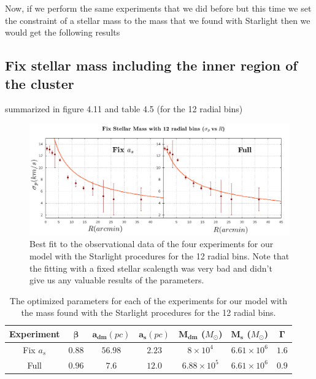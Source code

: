 Now, if we perform the same experiments that we did before but this time we set the constraint of a stellar mass to the mass that we found with Starlight then we would get the following results

\subsection{Fix stellar mass including the inner region of the cluster}

 summarized in figure 4.11 and table 4.5 (for the 12 radial bins)

\begin{figure}[H]
\centering
\includegraphics[width=15cm]{images/Starlight_2.png}
\caption[Best fit of our model with the mass found with the Starlight procedures for the 12 radial bins]{Best fit to the observational data of the four experiments for our model with the Starlight procedures for the 12 radial bins. Note that the fitting with a fixed stellar scalength was very bad and didn't give us any valuable results of the parameters.}
\end{figure}

\begin{table}[H]
\begin{center}
\begin{tabular}{| c| c| c| c| c| c| c|}
    \hline
    \textbf{Experiment} & $\mathbf{\beta}$ & $\mathbf{a_{dm}} (pc)$ & $\mathbf{a_{s}} (pc)$ & $\mathbf{M_{dm}}$ ($M_{\odot}$) & $\mathbf{M_{s}}$ ($M_{\odot}$) & $\mathbf{\Gamma}$\\ \hline
	Fix $a_s$ &	$0.88$ &	$56.98$ &	$2.23$ &	$8 \times 10^{4}$ &	$6.61 \times 10 ^{6}$ &	$1.6$\\ \hline
	Full &	$0.96$ &	$7.6$ &	$12.0$ &	$6.88 \times 10^{5}$ &	$6.61 \times 10^{6}$ &	$0.9$\\ \hline
  \end{tabular} 
\caption[Optimized parameters for our model with the mass found with the Starlight procedures for the 12 radial bins.]{The optimized parameters for each of the experiments for our model with the mass found with the Starlight procedures for the 12 radial bins.}
\end{center}
\end{table}

